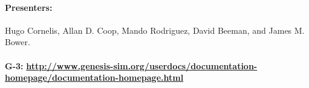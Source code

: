 \documentclass[12pt]{article}
\begin{document}
\paragraph*{Presenters:}
Hugo Cornelis, Allan D. Coop, Mando Rodriguez, David Beeman, and James M. Bower. \\

 \\
{\bf G-3:} {\scriptsize \href{http://www.genesis-sim.org/userdocs/documentation-homepage/documentation-homepage.html}{\bf http://www.genesis-sim.org/userdocs/documentation-homepage/documentation-homepage.html}} \\
\end{document}
